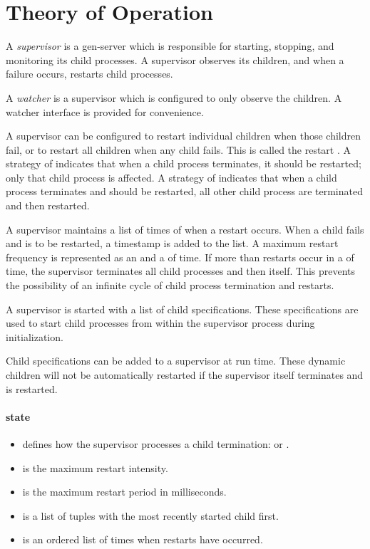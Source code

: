 \section {Theory of Operation}

A \emph{supervisor} is a gen-server which is
responsible for starting, stopping, and monitoring its child
processes. A supervisor observes its children, and when a failure
occurs, restarts child processes.

A \emph{watcher} is a supervisor which is configured to only observe
the children. A watcher interface is provided for convenience.

A supervisor can be configured to restart individual children when
those children fail, or to restart all children when any child
fails. This is called the restart . A strategy of
 indicates that when a child process terminates,
it should be restarted; only that child process is affected. A
strategy of  indicates that when a child process
terminates and should be restarted, all other child process are
terminated and then restarted.

A supervisor maintains a list of times of when a restart occurs. When
a child fails and is to be restarted, a timestamp is added to the
 list. A maximum restart frequency is represented as an
 and a  of time. If more than
 restarts occur in a  of time, the
supervisor terminates all child processes and then itself. This
prevents the possibility of an infinite cycle of child process
termination and restarts.

A supervisor is started with a list of child specifications. These
specifications are used to start child processes from within the
supervisor process during initialization.

Child specifications can be added to a supervisor at run time. These
dynamic children will not be automatically restarted if the supervisor
itself terminates and is restarted.

\paragraph*{state}
\begin{itemize}
  \item {} defines how the supervisor processes a child
    termination:  or .
  \item {} is the maximum restart intensity.
  \item {} is the maximum restart period in milliseconds.
  \item {} is a list of  tuples with
    the most recently started child first.
  \item {} is an ordered list of times when restarts
    have occurred.
\end{itemize}

